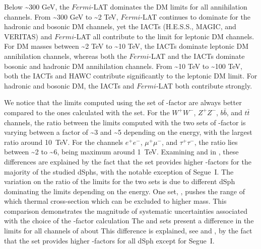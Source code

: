 Below \textasciitilde300 GeV, the $Fermi$-LAT dominates the DM limits for all annihilation channels.
From \textasciitilde300 GeV to \textasciitilde2 TeV, $Fermi$-LAT continues to dominate for the hadronic and bosonic DM channels, yet the IACTs (H.E.S.S., MAGIC, and VERITAS) and $Fermi$-LAT all contribute to the limit for leptonic DM channels.
For DM masses between \textasciitilde2 TeV to \textasciitilde10 TeV, the IACTs dominate leptonic DM annihilation channels, whereas both the $Fermi$-LAT and the IACTs dominate bosonic and hadronic DM annihilation channels.
From \textasciitilde10 TeV to \textasciitilde100 TeV, both the IACTs and HAWC contribute significantly to the leptonic DM limit.
For hadronic and bosonic DM, the IACTs and $Fermi$-LAT both contribute strongly.

We notice that the limits computed using the \B set of \J-factor are always better compared to the ones calculated with the \GS set.
For the $W^+W^-$, $Z^+Z^-$, $b\bar{b}$, and $t\bar{t}$ channels, the ratio between the limits computed with the two sets of \J-factor is varying between a factor of \textasciitilde3 and \textasciitilde5 depending on the energy, with the largest ratio around 10~TeV.
For the channels $e^+e^-$, $\mu^+\mu^-$, and $\tau^+\tau^-$, the ratio lies between \textasciitilde2 to \textasciitilde6, being maximum around 1~TeV.
Examining  and  in , these differences are explained by the fact that the \B set provides higher \J-factors for the majority of the studied dSphs, with the notable exception of Segue~I.
The variation on the ratio of the limits for the two sets is due to different dSph dominating the limits depending on the energy.
One set, \B, pushes the range of which thermal cross-section which can be excluded to higher mass.
This comparison demonstrates the magnitude of systematic uncertainties associated with the choice of the \J-factor calculation
The \GS and \B sets present a difference in the limits for all channels of about
This difference is explained, see   and , by the fact that the \B set provides higher \J-factors for all dSph except for Segue~I.

